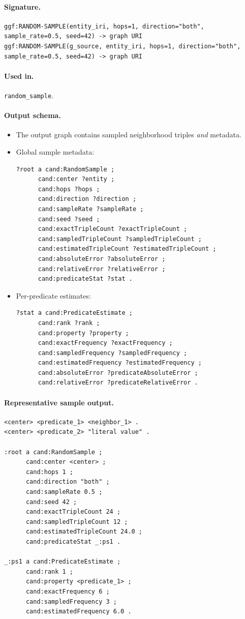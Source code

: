 \paragraph{Signature.}
\begin{verbatim}
ggf:RANDOM-SAMPLE(entity_iri, hops=1, direction="both", sample_rate=0.5, seed=42) -> graph URI
ggf:RANDOM-SAMPLE(g_source, entity_iri, hops=1, direction="both", sample_rate=0.5, seed=42) -> graph URI
\end{verbatim}

\paragraph{Used in.}
\texttt{random\_sample}.

\paragraph{Output schema.}
\begin{itemize}
\item The output graph contains sampled neighborhood triples \emph{and} metadata.
\item Global sample metadata:
\begin{verbatim}
?root a cand:RandomSample ;
      cand:center ?entity ;
      cand:hops ?hops ;
      cand:direction ?direction ;
      cand:sampleRate ?sampleRate ;
      cand:seed ?seed ;
      cand:exactTripleCount ?exactTripleCount ;
      cand:sampledTripleCount ?sampledTripleCount ;
      cand:estimatedTripleCount ?estimatedTripleCount ;
      cand:absoluteError ?absoluteError ;
      cand:relativeError ?relativeError ;
      cand:predicateStat ?stat .
\end{verbatim}
\item Per-predicate estimates:
\begin{verbatim}
?stat a cand:PredicateEstimate ;
      cand:rank ?rank ;
      cand:property ?property ;
      cand:exactFrequency ?exactFrequency ;
      cand:sampledFrequency ?sampledFrequency ;
      cand:estimatedFrequency ?estimatedFrequency ;
      cand:absoluteError ?predicateAbsoluteError ;
      cand:relativeError ?predicateRelativeError .
\end{verbatim}
\end{itemize}

\paragraph{Representative sample output.}
\begin{verbatim}
<center> <predicate_1> <neighbor_1> .
<center> <predicate_2> "literal value" .

:root a cand:RandomSample ;
      cand:center <center> ;
      cand:hops 1 ;
      cand:direction "both" ;
      cand:sampleRate 0.5 ;
      cand:seed 42 ;
      cand:exactTripleCount 24 ;
      cand:sampledTripleCount 12 ;
      cand:estimatedTripleCount 24.0 ;
      cand:predicateStat _:ps1 .

_:ps1 a cand:PredicateEstimate ;
      cand:rank 1 ;
      cand:property <predicate_1> ;
      cand:exactFrequency 6 ;
      cand:sampledFrequency 3 ;
      cand:estimatedFrequency 6.0 .
\end{verbatim}

